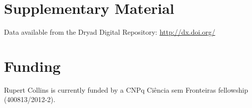 \documentclass[12pt]{article}
\begin{document}
\section*{Supplementary Material}

Data available from the Dryad Digital Repository: \url{http://dx.doi.org/}


\section*{Funding}

Rupert Collins is currently funded by a CNPq Ci\^encia sem Fronteiras fellowship (400813/2012-2).




%
%
\end{document}
